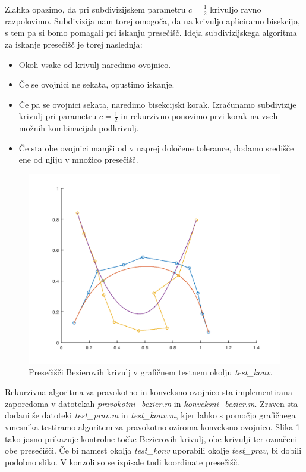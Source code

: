 \documentclass[a4paper, 12pt]{article} %
\begin{document}
Zlahka opazimo, da pri subdivizijskem parametru $c = \frac{1}{2}$ krivuljo ravno razpolovimo. Subdivizija nam torej omogoča, da na krivuljo apliciramo bisekcijo, s tem pa si bomo pomagali pri iskanju presečišč. Ideja subdivizijskega algoritma za iskanje presečišč je torej naslednja:
\begin{itemize}
\item Okoli vsake od krivulj naredimo ovojnico.
\item Če se ovojnici ne sekata, opustimo iskanje.
\item Če pa se ovojnici sekata, naredimo bisekcijski korak. Izračunamo subdivizije krivulj pri parametru $c = \frac{1}{2}$ in rekurzivno ponovimo prvi korak na vseh možnih kombinacijah podkrivulj.
\item Če sta obe ovojnici manjši od v naprej določene tolerance, dodamo središče ene od njiju v množico presečišč.
\end{itemize}

\begin{figure}[h!]
	\centering
	\includegraphics[scale=0.55]{konv}
	\caption{Presečišči Bezierovih krivulj v grafičnem testnem okolju \emph{test\_konv}.}
	\label{fig:konv}
\end{figure}

Rekurzivna algoritma za pravokotno in konveksno ovojnico sta implementirana zaporedoma v datotekah \emph{pravokotni\_bezier.m} in \emph{konveksni\_bezier.m}.
Zraven sta dodani še datoteki \emph{test\_prav.m} in \emph{test\_konv.m}, kjer lahko s pomočjo grafičnega vmesnika testiramo algoritem za pravokotno oziroma konveksno ovojnico.
Slika \ref{fig:konv} tako jasno prikazuje kontrolne točke Bezierovih krivulj, obe krivulji ter označeni obe presečišči. Če bi namest okolja \emph{test\_konv} uporabili okolje \emph{test\_prav}, bi dobili podobno sliko. V konzoli so se izpisale tudi koordinate presečišč.
\end{document}
